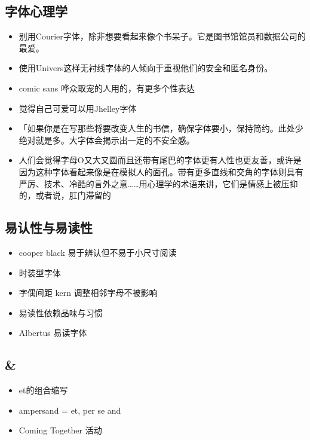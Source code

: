 \documentclass[
  letterpaper,
  DIV=11,
  numbers=noendperiod]{scrreprt}
\providecommand{\tightlist}{%
  \setlength{\itemsep}{0pt}\setlength{\parskip}{0pt}}\usepackage{longtable,booktabs,array}
\begin{document}
\subsection{字体心理学}\label{ux5b57ux4f53ux5fc3ux7406ux5b66}

\begin{itemize}
\tightlist
\item
  别用Courier字体，除非想要看起来像个书呆子。它是图书馆馆员和数据公司的最爱。
\item
  使用Univers这样无衬线字体的人倾向于重视他们的安全和匿名身份。
\item
  comic sans 哗众取宠的人用的，有更多个性表达
\item
  觉得自己可爱可以用Jhelley字体
\item
  「如果你是在写那些将要改变人生的书信，确保字体要小，保持简约。此处少绝对就是多。大字体会揭示出一定的不安全感。
\item
  人们会觉得字母O又大又圆而且还带有尾巴的字体更有人性也更友善，或许是因为这种字体看起来像是在模拟人的面孔。带有更多直线和交角的字体则具有严厉、技术、冷酷的言外之意\ldots\ldots 用心理学的术语来讲，它们是情感上被压抑的，或者说，肛门滞留的
\end{itemize}

\subsection{易认性与易读性}\label{ux6613ux8ba4ux6027ux4e0eux6613ux8bfbux6027}

\begin{itemize}
\tightlist
\item
  cooper black 易于辨认但不易于小尺寸阅读
\item
  时装型字体
\item
  字偶间距 kern 调整相邻字母不被影响
\item
  易读性依赖品味与习惯
\item
  Albertus 易读字体
\end{itemize}

\subsection{\&}\label{section}

\begin{itemize}
\tightlist
\item
  et的组合缩写
\item
  ampersand = et, per se and
\item
  Coming Together 活动
\end{itemize}
\end{document}
